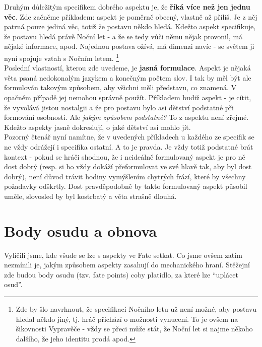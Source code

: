 \documentclass[../main.tex]{subfiles}
\begin{document}
Druhým důležitým specifikem dobrého aspektu je, že \textbf{říká více než jen jednu věc}. Zde začněme příkladem: aspekt  je poměrně obecný, vlastně až přílíš. Je z něj patrná pouze jediná věc, totiž že postavu někdo hledá. Kdežto aspekt  specifikuje, že postavu hledá právě Noční let - a že se tedy vůči němu nějak provonil, má nějaké informace, apod. Najednou postava ožívá, má dimenzi navíc - se světem ji nyní spojuje vztah s Nočním letem. \footnote{Zde by šlo navrhnout, že specifikací Nočního letu už není možné, aby postavu hledal někdo jiný, tj. hráč přichází o možnosti vynucení. To je ovšem na šikovnosti Vypravěče - vždy se přeci může stát, že Noční let si najme někoho dalšího, že jeho identitu prodá apod.}\\

Poslední vlastností, kterou zde uvedeme, je \textbf{jasná formulace}. Aspekt je nějaká věta psaná nedokonalým jazykem a konečným počtem slov. I tak by měl být ale formulován takovým způsobem, aby všichni měli představu, co znamená. V opačném případě jej nemohou správně použít. Příkladem budiž aspekt  - je cítit, že vyvolává jistou nostalgii a že pro postavu bylo asi dětství podstatné při formování osobnosti. Ale \textit{jakým způsobem podstatné?} To z aspektu není zřejmé. Kdežto aspekty  jasně dokreslují, o jaké dětství asi mohlo jít.\\

Pozorný čtenář nyní namítne, že v uvedených příkladech u každého ze specifik se ne vždy odrážejí i specifika ostatní. A to je pravda. Je vždy totiž podstatné brát kontext - pokud se hráči shodnou, že i neideálně formulovaný aspekt je pro ně dost dobrý (resp. si ho vždy dokáží přeformulovat ve své hlavě tak, aby byl dost dobrý), není důvod trávit hodiny vymýšlením chytrých frází, které by všechny požadavky odškrtly. Dost pravděpodobně by takto formulovaný aspekt působil uměle, slovosled by byl kostrbatý a věta strašně dlouhá.

\section{Body osudu a obnova}
\label{sec:body-osudu-obnova}

Vylíčili jsme, kde všude se lze s aspekty ve Fate setkat. Co jsme ovšem zatím nezmínili je, jakým způsobem aspekty zasahují do mechanického hraní. Stěžejní zde budou body osudu (tzv. fate points) coby platidlo, za které lze ``uplácet osud''. \\
\end{document}
